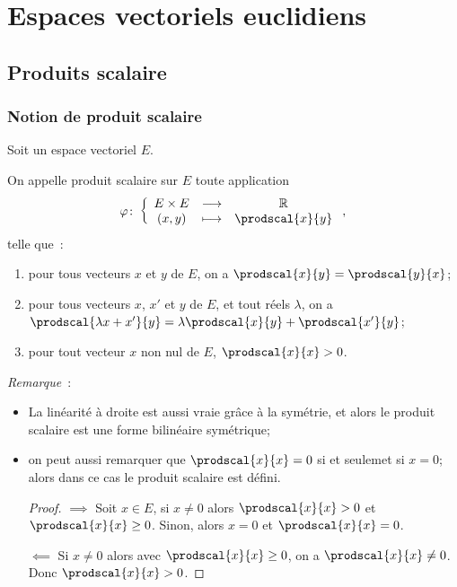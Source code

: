 \chapter{Espaces vectoriels euclidiens}
\label{chap:espaceseuclidiens}
\minitoc
\minilof
\minilot

\section{Produits scalaire}

\subsection{Notion de produit scalaire}

Soit un espace vectoriel $E$.
\begin{defdef}
  On appelle produit scalaire sur $E$ toute application
  \begin{equation}
    \fonction{\varphi}{E \times E}{\R}{(x,y)}{\prodscal{x}{y}},
  \end{equation}
  telle que~:
  \begin{enumerate}
  \item pour tous vecteurs $x$ et $y$ de $E$, on a $\prodscal{x}{y}=\prodscal{y}{x}$;
  \item pour tous vecteurs $x$, $x'$ et $y$ de $E$, et tout réels $\lambda$, on a $\prodscal{\lambda x +x'}{y} = \lambda\prodscal{x}{y} + \prodscal{x'}{y}$;
  \item pour tout vecteur $x$ non nul de $E$, $\prodscal{x}{x}>0$.
  \end{enumerate}
\end{defdef}
\emph{Remarque}~:
\begin{itemize}
\item La linéarité à droite est aussi vraie grâce à la symétrie, et alors le produit scalaire est une forme bilinéaire symétrique;
\item on peut aussi remarquer que $\prodscal{x}{x}=0$ si et seulemet si $x=0$; alors dans ce cas le produit scalaire est défini.
  \begin{proof}
    $\implies$ Soit $x \in E$, si $x\neq 0$ alors $\prodscal{x}{x}>0$ et $\prodscal{x}{x}\geq 0$. Sinon, alors $x=0$ et $\prodscal{x}{x}=0$.

    $\impliedby$ Si $x \neq 0$ alors avec $\prodscal{x}{x}\geq 0$, on a $\prodscal{x}{x} \neq 0$. Donc $\prodscal{x}{x}>0$.
  \end{proof}
\end{itemize}

